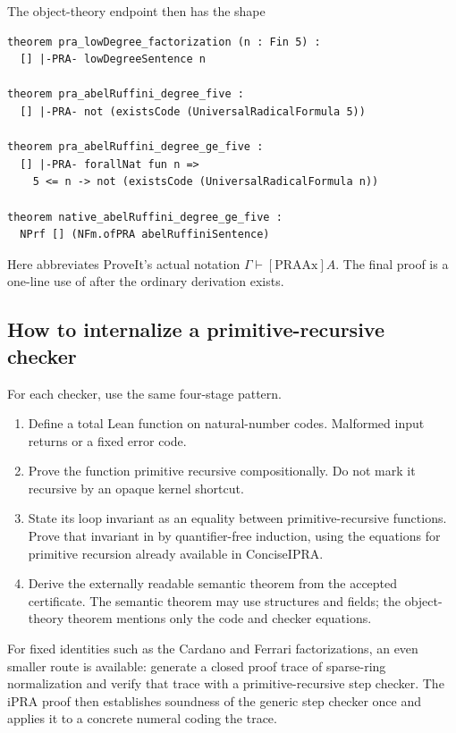 The object-theory endpoint then has the shape

\begin{lstlisting}[style=lean,language={},caption={Object-theory endpoints, schematic}]
theorem pra_lowDegree_factorization (n : Fin 5) :
  [] |-PRA- lowDegreeSentence n

theorem pra_abelRuffini_degree_five :
  [] |-PRA- not (existsCode (UniversalRadicalFormula 5))

theorem pra_abelRuffini_degree_ge_five :
  [] |-PRA- forallNat fun n =>
    5 <= n -> not (existsCode (UniversalRadicalFormula n))

theorem native_abelRuffini_degree_ge_five :
  NPrf [] (NFm.ofPRA abelRuffiniSentence)
\end{lstlisting}

Here  abbreviates ProveIt's actual notation
\(\Gamma \vdash[\mathrm{PRAAx}] A\).  The final proof is a one-line use of
 after the ordinary derivation exists.

\subsection{How to internalize a primitive-recursive checker}

For each checker, use the same four-stage pattern.

\begin{enumerate}
\item Define a total Lean function on natural-number codes.  Malformed input
  returns  or a fixed error code.
\item Prove the function primitive recursive compositionally.  Do not mark it
  recursive by an opaque kernel shortcut.
\item State its loop invariant as an equality between primitive-recursive
  functions.  Prove that invariant in  by quantifier-free
  induction, using the equations for primitive recursion already available in
  ConciseIPRA.
\item Derive the externally readable semantic theorem from the accepted
  certificate.  The semantic theorem may use structures and fields; the
  object-theory theorem mentions only the code and checker equations.
\end{enumerate}

For fixed identities such as the Cardano and Ferrari factorizations, an even
smaller route is available: generate a closed proof trace of sparse-ring
normalization and verify that trace with a primitive-recursive step checker.
The iPRA proof then establishes soundness of the generic step checker once and
applies it to a concrete numeral coding the trace.

